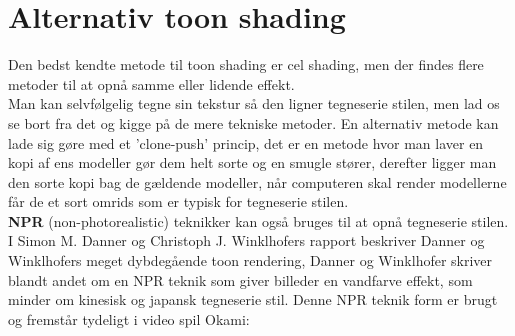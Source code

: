 \newpage
\section{Alternativ toon shading}
Den bedst kendte metode til toon shading er cel shading, men der findes flere metoder til at opnå samme eller lidende effekt.\\
Man kan selvfølgelig tegne sin tekstur så den ligner tegneserie stilen, men lad os se bort fra det og kigge på de mere tekniske metoder. En alternativ metode kan lade sig gøre med et ’clone-push’ princip\cite{clone-push}, det er en metode hvor man laver en kopi af ens modeller gør dem helt sorte og en smugle stører, derefter ligger man den sorte kopi bag de gældende modeller, når computeren skal render modellerne får de et sort omrids som er typisk for tegneserie stilen.\\

\textbf{NPR} (non-photorealistic) teknikker kan også bruges til at opnå tegneserie stilen. I Simon M. Danner og Christoph J. Winklhofers rapport\cite{npr} beskriver Danner og Winklhofers meget dybdegående toon rendering, Danner og Winklhofer skriver blandt andet om en NPR teknik som giver billeder en vandfarve effekt, som minder om kinesisk og japansk tegneserie stil. Denne NPR teknik form er brugt og fremstår tydeligt i video spil Okami:
